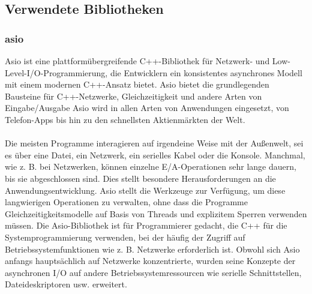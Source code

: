 \documentclass[a4paper,12pt]{article}
\begin{document}
\subsection{Verwendete Bibliotheken}
\subsubsection{asio}
Asio ist eine plattformübergreifende C++-Bibliothek für Netzwerk- und Low-Level-I/O-Programmierung, die Entwicklern ein konsistentes asynchrones Modell mit einem modernen C++-Ansatz bietet.
Asio bietet die grundlegenden Bausteine für C++-Netzwerke, Gleichzeitigkeit und andere Arten von Eingabe/Ausgabe
Asio wird in allen Arten von Anwendungen eingesetzt, von Telefon-Apps bis hin zu den schnellsten Aktienmärkten der Welt.\\\\
Die meisten Programme interagieren auf irgendeine Weise mit der Außenwelt, sei es über eine Datei, ein Netzwerk, ein serielles Kabel oder die Konsole. Manchmal, wie z. B. bei Netzwerken, können einzelne E/A-Operationen sehr lange dauern, bis sie abgeschlossen sind. Dies stellt besondere Herausforderungen an die Anwendungsentwicklung.
Asio stellt die Werkzeuge zur Verfügung, um diese langwierigen Operationen zu verwalten, ohne dass die Programme Gleichzeitigkeitsmodelle auf Basis von Threads und explizitem Sperren verwenden müssen.
Die Asio-Bibliothek ist für Programmierer gedacht, die C++ für die Systemprogrammierung verwenden, bei der häufig der Zugriff auf Betriebssystemfunktionen wie z. B. Netzwerke erforderlich ist. Obwohl sich Asio anfangs hauptsächlich auf Netzwerke konzentrierte, wurden seine Konzepte der asynchronen I/O auf andere Betriebssystemressourcen wie serielle Schnittstellen, Dateideskriptoren usw. erweitert.
\end{document}

